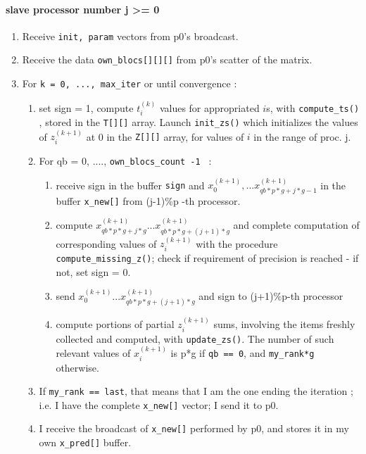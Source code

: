 \documentclass[a4paper,12pt]{article}
\begin{document}
\paragraph{slave processor number j >= 0}
\begin{enumerate}
\item Receive {\tt init, param} vectors from p0's broadcast.
\item Receive the data {\tt own\_blocs[][][]} from p0's scatter of the matrix.
\item For {\tt k = 0, ..., max\_iter} or until convergence :
\begin{enumerate}
	\item set sign = 1, compute $t_i^{(k)}$ values for appropriated $i$s, with {\tt compute\_ts()} , stored in the {\tt T[][]} array. Launch {\tt init\_zs()} which initializes the values of $z_i^{(k+1)}$ at 0 in the {\tt Z[][]} array, for values of $i$ in the range of proc. j.
	\item For qb = 0, ...., {\tt own\_blocs\_count -1 } :
		\begin{enumerate}
		\item receive sign in the buffer {\tt sign} and $x^{(k+1)}_0, ... x^{(k+1)}_{qb*p*g + j*g -1}$ in the buffer {\tt x\_new[]} from (j-1)\%p -th processor.
		\item compute $x^{(k+1)}_{qb*p*g + j*g}... x^{(k+1)}_{qb*p*g + (j+1)*g}$ and complete computation of corresponding values of $z_i^{(k+1)}$ with the procedure {\tt compute\_missing\_z()}; check if requirement of precision is reached - if not, set sign = 0.
		\item send $x^{(k+1)}_{0}... x^{(k+1)}_{qb*p*g + (j+1)*g}$ and sign to (j+1)\%p-th processor
		\item compute portions of partial $z_i^{(k+1)}$ sums, involving the items freshly collected and computed, with {\tt update\_zs()}. The number of such relevant values of $x_i^{(k+1)}$ is p*g if {\tt qb == 0}, and {\tt my\_rank*g} otherwise.
		\end{enumerate}
	\item If {\tt my\_rank == last}, that means that I am the one ending the iteration ; i.e. I have the complete {\tt x\_new[]} vector; I send it to p0. 
	
	\item I receive the broadcast of {\tt x\_new[]} performed by p0, and stores it in my own {\tt x\_pred[]} buffer.
	\end{enumerate}
\end{enumerate}
\end{document}
